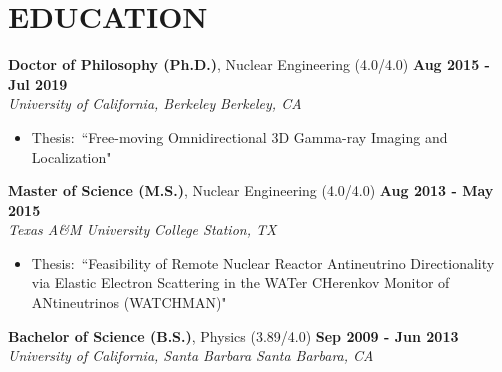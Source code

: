 \section{\small{EDUCATION}}

\textbf{Doctor of Philosophy (Ph.D.)}, Nuclear Engineering (4.0/4.0) \hfill \textbf{Aug 2015 - Jul 2019} \\
\textsl{University of California, Berkeley} \hfill \textsl{Berkeley, CA}\\[-2.8ex]
\vspace{2pt}
\begin{itemize}[leftmargin=4ex] \itemsep -2pt
	\item Thesis:~``Free-moving Omnidirectional 3D Gamma-ray Imaging and Localization"
\end{itemize}
\vspace{-5pt}

\textbf{Master of Science (M.S.)}, Nuclear Engineering (4.0/4.0) \hfill \textbf{Aug 2013 - May 2015} \\
\textsl{Texas A\&M University} \hfill \textsl{College Station, TX}\\[-2.8ex]
\vspace{2pt}
\begin{itemize}[leftmargin=4ex] \itemsep -2pt
	\item Thesis:~``Feasibility of Remote Nuclear Reactor Antineutrino Directionality via Elastic Electron Scattering in the WATer CHerenkov Monitor of ANtineutrinos (WATCHMAN)"
\end{itemize}
\vspace{-5pt}

\textbf{Bachelor of Science (B.S.)}, Physics (3.89/4.0) \hfill \textbf{Sep 2009 - Jun 2013} \\
\textsl{University of California, Santa Barbara} \hfill \textsl{Santa Barbara, CA}\\[-2.8ex]
